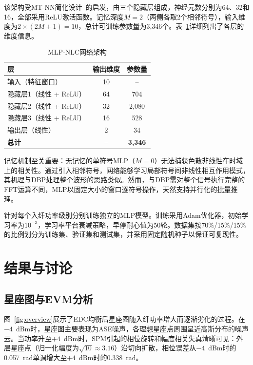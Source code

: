 \documentclass[conference]{IEEEtran}
\begin{document}
该架构受MT-NN简化设计~\cite{mtnn2025}的启发，由三个隐藏层组成，神经元数分别为64、32和16，全部采用ReLU激活函数。记忆深度$M = 2$（两侧各取2个相邻符号），输入维度为$2 \times (2M + 1) = 10$，总计可训练参数量为3,346个。表~\ref{tab:arch}详细列出了各层的维度信息。

\begin{table}[h]
\centering
\caption{MLP-NLC网络架构}
\label{tab:arch}
\begin{tabular}{@{}lcc@{}}
\toprule
\textbf{层} & \textbf{输出维度} & \textbf{参数量} \\
\midrule
输入（特征窗口）  & 10      & -- \\
隐藏层1（线性 + ReLU） & 64     & 704 \\
隐藏层2（线性 + ReLU） & 32     & 2,080 \\
隐藏层3（线性 + ReLU） & 16     & 528 \\
输出层（线性）          & 2      & 34 \\
\midrule
\textbf{总计}           & --     & \textbf{3,346} \\
\bottomrule
\end{tabular}
\end{table}

记忆机制至关重要：无记忆的单符号MLP（$M = 0$）无法捕获色散非线性在时域上的相关性。通过引入相邻符号，网络能够学习局部符号间非线性相互作用模式，其机理与DBP处理整个波形的思路类似。然而，与DBP需对整个信号执行完整的FFT运算不同，MLP以固定大小的窗口逐符号操作，天然支持并行化的批量推理。

针对每个入纤功率级别分别训练独立的MLP模型。训练采用Adam优化器，初始学习率为$10^{-3}$，学习率平台衰减策略，早停耐心值为50轮。数据集按70\%/15\%/15\%的比例划分为训练集、验证集和测试集，并采用固定随机种子以保证可复现性。

\section{结果与讨论}
\label{sec:results}

\subsection{星座图与EVM分析}

图~\ref{fig:overview}展示了EDC均衡后星座图随入纤功率增大而逐渐劣化的过程。在$-4$~dBm时，星座图主要表现为ASE噪声，各理想星座点周围呈近高斯分布的噪声云。当功率升至$+4$~dBm时，SPM引起的相位旋转和幅度相关失真清晰可见：外层星座点（归一化幅度为$\sqrt{10} \approx 3.16$）沿切向扩散，相位误差从$-4$~dBm时的0.057~rad单调增大至$+4$~dBm时的0.338~rad。
\end{document}
